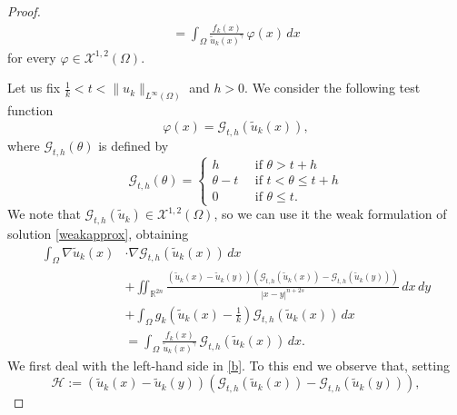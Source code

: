 \documentclass[11pt,a4paper]{amsart}
\def \N {\mathbb{N}}
\def \R {\mathbb{R}}
\def \XX {\mathcal{X}}
\theoremstyle{definition}
\theoremstyle{plain}
\numberwithin{equation}{section}
\begin{document}
{\begin{proof}
\begin{equation}
\begin{split}
=\int_{\Omega}\frac{f_k(x)}{\tilde u_k(x)^{\gamma}}\,\varphi(x)\,dx
\end{split}
\end{equation}
for every $\varphi\in \XX^{1,2}(\Omega)$.

\vspace{0.2cm}

Let us fix $\frac{1}{k}< t<\|u_k\|_{L^\infty(\Omega)}$ and $h>0$. We consider the following test function 
$$\varphi(x)=\mathcal{G}_{t,h}(\tilde u_k(x)),$$ 
where $\mathcal{G}_{t,h}(\theta)$ is defined by
\begin{equation}\label{def-G}
\mathcal{G}_{t,h}(\theta)=\begin{cases}
h \qquad & \mbox{if } \theta>t+h\\
\theta-t & \mbox{if } t<\theta\leq t+h\\
0  & \mbox{if } \theta\leq t.
\end{cases}
\end{equation}
We note that $\mathcal{G}_{t,h}(\tilde u_k)\in \XX^{1,2}(\Omega)$, so we can use it the weak formulation of solution \eqref{weakapprox}, obtaining
\begin{equation}\label{b}
\begin{aligned}
\int_{\Omega}\nabla \tilde u_k(x)&\cdot\nabla\mathcal{G}_{t,h}(\tilde u_k(x))\,dx\\
&+\iint_{\R^{2n}}\frac{(\tilde u_k(x)-\tilde u_k(y))\left(\mathcal{G}_{t,h}(\tilde u_k(x))-\mathcal{G}_{t,h}(\tilde u_k(y))\right)}{|x-y|^{n+2s}}\,dx\,dy\\
&+\int_\Omega
g_k\left(\tilde u_k(x)-\frac 1 k \right)\mathcal{G}_{t,h}(\tilde u_k(x))\,dx\\
&=\int_{\Omega}\frac{f_k(x)}{\tilde u_k(x)^{\gamma}}\,\mathcal{G}_{t,h}(\tilde u_k(x))\,dx.
\end{aligned}
\end{equation}
We first deal with the left-hand side in \eqref{b}. To this end we observe that, setting\begin{equation*}
\mathcal{H}:= (\tilde u_k(x)-\tilde u_k(y))\left(\mathcal{G}_{t,h}(\tilde u_k(x))-\mathcal{G}_{t,h}(\tilde u_k(y))\right),
\end{equation*}

\end{proof}}
\end{document}
